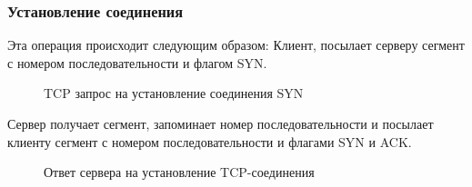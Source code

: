 \documentclass[a4paper, 14pt,russian]{article}
\begin{document}
	\subsubsection{Установление соединения}
		Эта операция происходит следующим образом: 
		Клиент, посылает серверу сегмент с номером последовательности и флагом SYN.
		\begin{figure}[h!]
			\caption{TCP запрос на установление соединения SYN}
			\label{img:tcp_syn}
		\end{figure}
		Сервер получает сегмент, запоминает номер последовательности и посылает клиенту сегмент с номером последовательности и флагами SYN и ACK.
		\begin{figure}[h!]
			\caption{Ответ сервера на установление TCP-соединения}
			\label{img:tcp_syn_ack}
		\end{figure}
\end{document}
